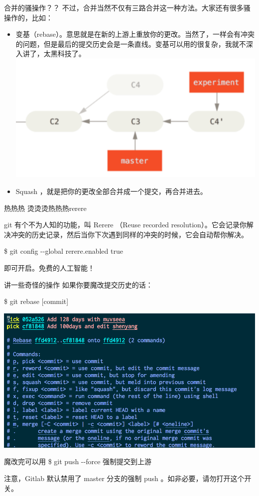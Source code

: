\documentclass{beamer}
\begin{document}
\begin{frame}{合并的骚操作？？}
    不过，合并当然不仅有三路合并这一种方法。大家还有很多骚操作的，比如：

    \begin{itemize}
        \item 变\quad 基（rebase）。意思就是在新的上游上重放你的更改。当然了，一样会有冲突的问题，但是最后的提交历史会是一条直线。变基可以用的很复杂，我就不深入讲了，太黑科技了。
        \includegraphics[width=\linewidth]{2018-10-26-16-23-42.png}
        \item Squash ，就是把你的更改全部合并成一个提交，再合并进去。
    \end{itemize}
\end{frame}

\begin{frame}{热热热}
    烫烫烫热热热rerere

    git 有个不为人知的功能，叫 Rerere （Reuse recorded resolution）。它会记录你解决冲突的历史记录，然后当你下次遇到同样的冲突的时候，它会自动帮你解决。

    \$ git config -{}-global rerere.enabled true

    即可开启。免费的人工智能！
\end{frame}

\begin{frame}{讲一些奇怪的操作}
    如果你要魔改提交历史的话：

    \$ git rebase [commit]

    \includegraphics[width=\linewidth]{2018-10-26-20-03-30.png}

    魔改完可以用 \$ git push -{}-force 强制提交到上游

    注意，Gitlab 默认禁用了 master 分支的强制 push 。如非必要，请勿打开这个开关。
\end{frame}
\end{document}
